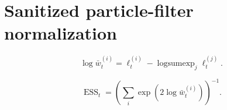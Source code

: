 \section{Sanitized particle-filter normalization}

\begin{equation}\label{eq:dept-particle-normalization}
\log \bar w_t^{(i)} = \ell_t^{(i)} - \operatorname{logsumexp}_j \ell_t^{(j)}.
\end{equation}

\begin{equation}\label{eq:dept-particle-ess}
\operatorname{ESS}_t = \left(\sum_i \exp(2\log \bar w_t^{(i)})\right)^{-1}.
\end{equation}
